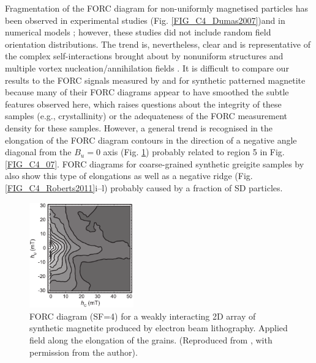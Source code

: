 Fragmentation of the FORC diagram for non-uniformly magnetised particles has been observed in experimental studies \citep{Pike1999B,Dumas2007,Roberts2017,Zhao2017} (Fig. \ref{FIG_C4_Dumas2007})and in numerical models \citep{Carvallo2003,Roberts2017}; however, these studies did not include random field orientation distributions. The trend is, nevertheless, clear and is representative of the complex self-interactions brought about by nonuniform structures and multiple vortex nucleation/annihilation fields \citep{Pike1999B}. It is difficult to compare our results to the FORC signals measured by \citet{Muxworthy2006B} and \citet{Krasa2011} for synthetic patterned magnetite because many of their FORC diagrams appear to have smoothed the subtle features observed here, which raises questions about the integrity of these samples (e.g., crystallinity) or the adequateness of the FORC measurement density for these samples. However, a general trend is recognised in the elongation of the FORC diagram contours in the direction of a negative angle diagonal from the $B_u=0$ axis (Fig. \ref{FIG_C4_Muxworthy2006B}) probably related to region 5 in Fig. \ref{FIG_C4_07}. FORC diagrams for coarse-grained synthetic greigite samples by \citet{Roberts2011} also show this type of elongations as well as a negative ridge (Fig. \ref{FIG_C4_Roberts2011}i--l) probably caused by a fraction of SD particles.
\begin{figure}
\centering
\includegraphics[width=0.4\textwidth]{research-3/figs/Muxworthy2006B.pdf}
\caption[FORC diagram of a synthetic magnetite 2D array]{FORC diagram (SF=4) for a weakly interacting 2D array of synthetic magnetite produced by electron beam lithography. Applied field along the elongation of the grains. (Reproduced from \citet{Muxworthy2006B}, with permission from the author).}
\label{FIG_C4_Muxworthy2006B}
\end{figure}\par

